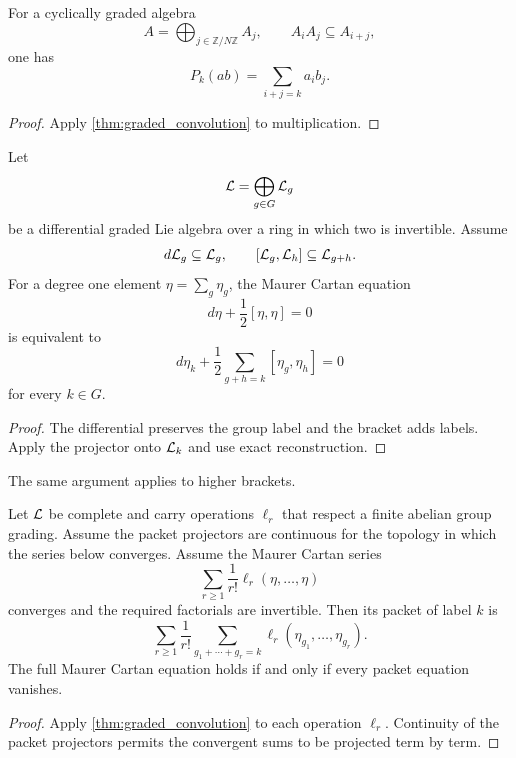 \begin{corollary}\label{cor:cyclic_product}
For a cyclically graded algebra
\[
A=\bigoplus_{j\in\mathbb Z/N\mathbb Z}A_j,
\qquad
A_iA_j\subseteq A_{i+j},
\]
one has
\[
P_k(ab)=
\sum_{i+j=k}a_ib_j.
\]
\end{corollary}

\begin{proof}
Apply \cref{thm:graded_convolution} to multiplication.
\end{proof}

\begin{theorem}\label{thm:packet_mc}
Let
\[
\mathcal L=\bigoplus_{g\in G}\mathcal L_g
\]
be a differential graded Lie algebra over a ring in which two is invertible.  Assume
\[
d\mathcal L_g\subseteq\mathcal L_g,
\qquad
[\mathcal L_g,\mathcal L_h]\subseteq\mathcal L_{g+h}.
\]
For a degree one element $\eta=\sum_g\eta_g$, the Maurer Cartan equation
\[
d\eta+\frac12[\eta,\eta]=0
\]
is equivalent to
\[
d\eta_k
+
\frac12
\sum_{g+h=k}[\eta_g,\eta_h]
=0
\]
for every $k\in G$.
\end{theorem}

\begin{proof}
The differential preserves the group label and the bracket adds labels.  Apply the projector onto $\mathcal L_k$ and use exact reconstruction.
\end{proof}

The same argument applies to higher brackets.

\begin{proposition}\label{prop:packet_l_infinity}
Let $\mathcal L$ be complete and carry operations $\ell_r$ that respect a finite abelian group grading. Assume the packet projectors are continuous for the topology in which the series below converges.  Assume the Maurer Cartan series
\[
\sum_{r\ge1}\frac1{r!}\ell_r(\eta,\ldots,\eta)
\]
converges and the required factorials are invertible.  Then its packet of label $k$ is
\[
\sum_{r\ge1}\frac1{r!}
\sum_{g_1+\cdots+g_r=k}
\ell_r(\eta_{g_1},\ldots,\eta_{g_r}).
\]
The full Maurer Cartan equation holds if and only if every packet equation vanishes.
\end{proposition}

\begin{proof}
Apply \cref{thm:graded_convolution} to each operation $\ell_r$.  Continuity of the packet projectors permits the convergent sums to be projected term by term.
\end{proof}

